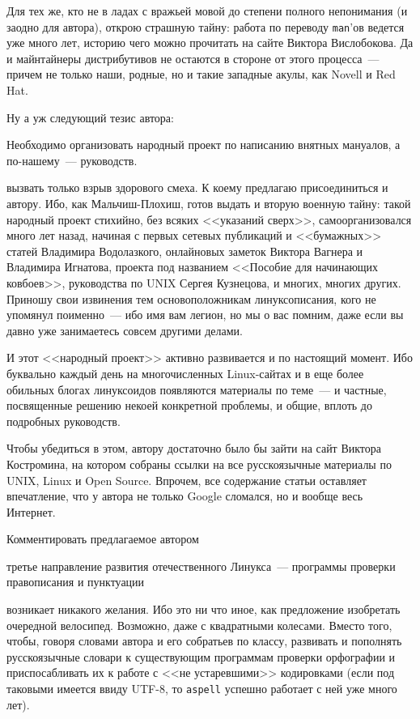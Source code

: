 Для тех же, кто не в ладах с вражьей мовой до степени полного непонимания (и заодно для автора), открою страшную тайну: работа по переводу \texttt{man}'ов ведется уже много лет, историю чего можно прочитать на сайте Виктора Вислобокова. Да и майнтайнеры дистрибутивов не остаются в стороне от этого процесса~--- причем не только наши, родные, но и такие западные акулы, как Novell и Red Hat. 

Ну а уж следующий тезис автора: 
\begin{shadequote}{}
Необходимо организовать народный проект по написанию внятных мануалов, а по-нашему~--- руководств.
\end{shadequote}

 вызвать только взрыв здорового смеха. К коему предлагаю присоединиться и автору. Ибо, как Мальчиш-Плохиш, готов выдать и вторую военную тайну: такой народный проект стихийно, без всяких <<указаний сверх>>, самоорганизовался много лет назад, начиная с первых сетевых публикаций и <<бумажных>> статей Владимира Водолазкого, онлайновых заметок Виктора Вагнера и Владимира Игнатова, проекта под названием <<Пособие для начинающих ковбоев>>, руководства по UNIX Сергея Кузнецова, и многих, многих других. Приношу свои извинения тем основоположникам линуксописания, кого не упомянул поименно~--- ибо имя вам легион, но мы о вас помним, даже если вы давно уже занимаетесь совсем другими делами. 

И этот <<народный проект>> активно развивается и по настоящий момент. Ибо буквально каждый день на многочисленных Linux-сайтах и в еще более обильных блогах линуксоидов появляются материалы по теме~--- и частные, посвященные решению некоей конкретной проблемы, и общие, вплоть до подробных руководств. 

Чтобы убедиться в этом, автору достаточно было бы зайти на сайт Виктора Костромина, на котором собраны ссылки на все русскоязычные материалы по UNIX, Linux и Open Source. Впрочем, все содержание статьи оставляет впечатление, что у автора не только Google сломался, но и вообще весь Интернет. 

Комментировать предлагаемое автором 
\begin{shadequote}{}
третье направление развития отечественного Линукса~--- программы проверки правописания и пунктуации
\end{shadequote}

 возникает никакого желания. Ибо это ни что иное, как предложение изобретать очередной велосипед. Возможно, даже с квадратными колесами. Вместо того, чтобы, говоря словами автора и его собратьев по классу, развивать и пополнять русскоязычные словари к существующим программам проверки орфографии и приспосабливать их к работе с <<не устаревшими>> кодировками (если под таковыми имеется ввиду UTF-8, то \texttt{aspell} успешно работает с ней уже много лет). 

